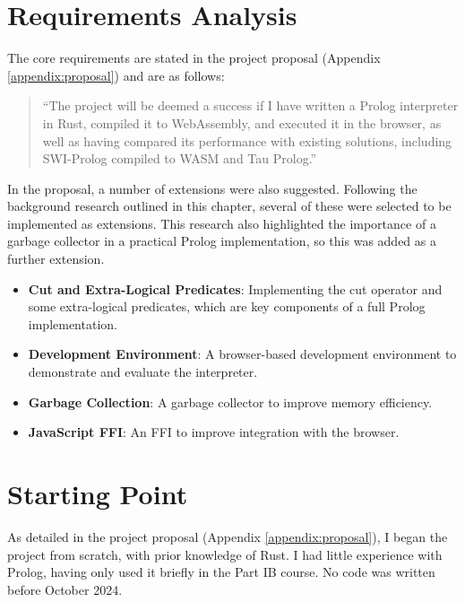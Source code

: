 \section{Requirements Analysis}

\label{sec:requirements}

The core requirements are stated in the project proposal (Appendix \ref{appendix:proposal}) and are as follows:

\vspace*{-1em}

\begin{quote}
``The project will be deemed a success if I have written a Prolog interpreter in Rust, compiled it to WebAssembly, and executed it in the browser, as well as having compared its performance with existing solutions, including SWI-Prolog compiled to WASM and Tau Prolog.''
\end{quote}

\vspace*{-1em}

In the proposal, a number of extensions were also suggested. Following the background research outlined in this chapter, several of these were selected to be implemented as extensions. This research also highlighted the importance of a garbage collector in a practical Prolog implementation, so this was added as a further extension.

\begin{itemize}
\setlength{\itemsep}{0em}
\item \textbf{Cut and Extra-Logical Predicates}: Implementing the cut operator and some extra-logical predicates, which are key components of a full Prolog implementation.
\item \textbf{Development Environment}: A browser-based development environment to demonstrate and evaluate the interpreter.
\item \textbf{Garbage Collection}: A garbage collector to improve memory efficiency.
\item \textbf{JavaScript FFI}: An FFI to improve integration with the browser.
\end{itemize}

\section{Starting Point}

\label{sec:starting-point}

As detailed in the project proposal (Appendix \ref{appendix:proposal}), I began the project from scratch, with prior knowledge of Rust. I had little experience with Prolog, having only used it briefly in the Part IB course. No code was written before October 2024.